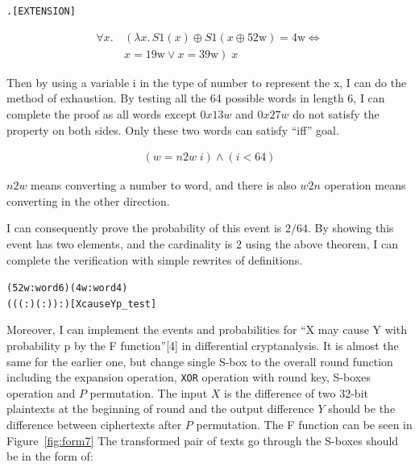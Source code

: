 \documentclass{article}
\begin{document}
\begin{alltt}
  \HOLTokenTurnstile{}  \HOLSymConst{=}  \HOLSymConst{\HOLTokenEquiv{}} \HOLSymConst{\HOLTokenForall{}}.  \HOLSymConst{\HOLTokenIn{}}  \HOLSymConst{\HOLTokenEquiv{}}  \HOLSymConst{\HOLTokenIn{}} \hfill{[EXTENSION]}
\end{alltt}

\begin{equation*}
\begin{split}
   \forall x.\, &\left( \lambda x.\, S1(x) \oplus S1(x \oplus 52\text{w}) = 4\text{w} \Leftrightarrow \right. \\
   & \left. x = 19\text{w} \vee x = 39\text{w} \right)\; x
\end{split}
\end{equation*}

Then by using a variable i in the type of number to represent the x, I can do the method of exhaustion. By testing
all the 64 possible words in length 6, I can complete the proof as all words except $0x13w$ and $0x27w$ do not
satisfy the property on both sides. Only these two words can satisfy ``iff'' goal.

\begin{equation*}
\begin{split}
    (w = n2w \; i) \land (i < 64)
\end{split}
\end{equation*}

$n2w$ means converting a number to word, and there is also $w2n$ operation means converting in the other direction.

I can consequently prove the probability of this event is $2/64$. By showing this event has two elements, and the cardinality
is 2 using the above theorem, I can complete the verification with simple rewrites of definitions.

\begin{alltt}
  \HOLTokenTurnstile{}  (52w :word6) (4w :word4) 
     ((( :) \HOLSymConst{/} ( :)) :)\hfill{[XcauseYp_test]}
\end{alltt}

Moreover, I can implement the events and probabilities for ``X may cause Y with probability p by the F function''[4] in
differential cryptanalysis. It is almost the same for the earlier one, but change single S-box to the overall round
function including the expansion operation, \verb|XOR| operation with round key, S-boxes operation and $P$ permutation. The
input $X$ is the difference of two 32-bit plaintexts at the beginning of round and the output difference $Y$ should
be the difference between ciphertexts after $P$ permutation. The F function can be seen in Figure~\ref{fig:form7}
The transformed pair of texts go through the S-boxes
should be in the form of:
\end{document}
